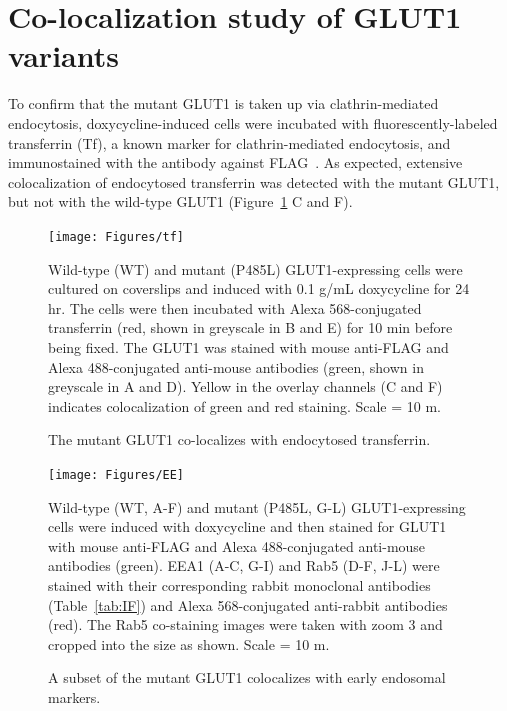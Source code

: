 \section{Co-localization study of GLUT1 variants}
To confirm that the mutant GLUT1 is taken up via clathrin-mediated endocytosis, doxycycline-induced cells were incubated with fluorescently-labeled transferrin (Tf), a known marker for clathrin-mediated endocytosis, and immunostained with the antibody against FLAG~\cite{Hanover}. As expected, extensive colocalization of endocytosed transferrin was detected with the mutant GLUT1, but not with the wild-type GLUT1 (Figure~\ref{fig:tf} C and F).
\begin{figure}[h]
\centering
\texttt{[image: Figures/tf]}
\caption{The mutant GLUT1 co-localizes with endocytosed transferrin.}
\vspace*{-3mm}
\small \justify
Wild-type (WT) and mutant (P485L) GLUT1-expressing cells were cultured on coverslips and induced with 0.1 \textmu g/mL doxycycline for 24 hr. The cells were then incubated with Alexa 568-conjugated transferrin (red, shown in greyscale in B and E) for 10 min before being fixed. The GLUT1 was stained with mouse anti-FLAG and Alexa 488-conjugated anti-mouse antibodies (green, shown in greyscale in A and D). Yellow in the overlay channels (C and F) indicates colocalization of green and red staining. Scale = 10 \textmu m.
\label{fig:tf}
\end{figure}
\begin{figure}[h]
\centering
\texttt{[image: Figures/EE]}
\caption{A subset of the mutant GLUT1 colocalizes with early endosomal markers.}
\vspace*{-3mm}
\small \justify
Wild-type (WT, A-F) and mutant (P485L, G-L) GLUT1-expressing cells were induced with doxycycline and then stained for GLUT1 with mouse anti-FLAG and Alexa 488-conjugated anti-mouse antibodies (green). EEA1 (A-C, G-I) and Rab5 (D-F, J-L) were stained with their corresponding rabbit monoclonal antibodies (Table~\ref{tab:IF}) and Alexa 568-conjugated anti-rabbit antibodies (red). The Rab5 co-staining images were taken with zoom 3 and cropped into the size as shown. Scale = 10 \textmu m.
\label{fig:ee}
\end{figure}

